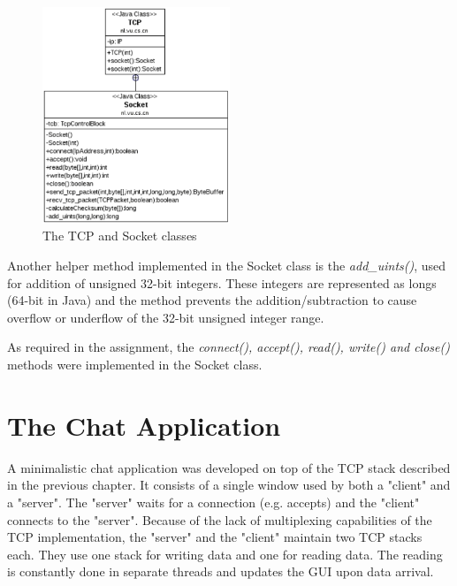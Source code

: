 \documentclass{article}
\begin{document}
\begin{figure}[h!]
 \centering
 \includegraphics[width=0.5\textwidth]{images/tcp_socket}
 \caption{The TCP and Socket classes}
  \label{fig:socket}
\end{figure}

Another helper method implemented in the Socket class is the \textit{add\_uints()}, used for addition of unsigned 32-bit
integers. These integers are represented as longs (64-bit in Java) and the method prevents the addition/subtraction to
cause overflow or underflow of the 32-bit unsigned integer range.

As required in the assignment, the \textit{connect(), accept(), read(), write() and close()} methods were implemented
in the Socket class.



\section{The Chat Application}
A minimalistic chat application was developed on top of the TCP stack described in the previous chapter.
It consists of a single window used by both a "client" and a "server". The "server" waits for a connection
(e.g. accepts) and the "client" connects to the "server". Because of the lack of multiplexing capabilities
of the TCP implementation, the "server" and the "client" maintain two TCP stacks each. They use one stack
for writing data and one for reading data. The reading is constantly done in separate threads and updates
the GUI upon data arrival.
\end{document}
